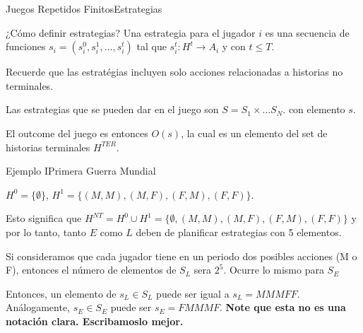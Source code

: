 \documentclass[notes, 11pt]{beamer} %
\newenvironment{wideitemize}{\itemize\addtolength{\itemsep}{10pt}}{\enditemize}
\begin{document}
\begin{frame}{Juegos Repetidos Finitos}{Estrategias}
	\begin{wideitemize}
		\item<1-> ¿C\'omo definir estrategias? Una estrategia para el jugador $i$ es una secuencia de funciones $s_{i} = (s_{i}^{0}, s_{i}^{1}, \dots, s_{i}^{t})$ tal que $s_{i}^{t}: H^{t} \rightarrow A_{i}$ y con $t\leq T$.
		\item<2-> Recuerde que las estrat\'egias incluyen solo acciones relacionadas a historias no terminales.
		\item<3-> Las estrategias que se pueden dar en el juego son $S = S_{1} \times \dots S_{N}$. con elemento $s$.
		\item<4-> El outcome del juego es entonces $O(s)$, la cual es un elemento del set de historias terminales $H^{TER}$.
	\end{wideitemize}
\end{frame}

\begin{frame}{Ejemplo I}{Primera Guerra Mundial}
	\begin{wideitemize}
		\item<1-> $H^{0} = \{ \emptyset \}$, $H^{1} = \{ (M,M), (M,F), (F,M), (F,F) \}$.
		\item<2-> Esto significa que $H^{NT} = H^{0} \cup H^{1} = \{ \emptyset, (M,M), (M,F), (F,M), (F,F) \}$ y por lo tanto, tanto $E$ como $L$ deben de planificar estrategias con 5 elementos.
		\item<3-> Si consideramos que cada jugador tiene en un periodo dos posibles acciones (M o F), entonces el n\'umero de elementos de $S_{L}$ sera $2^{5}$. Ocurre lo mismo para $S_{E}$
		\item<4-> Entonces, un elemento de $s_{L} \in S_{L}$ puede ser igual a $s_{L} = MMMFF$. An\'alogamente, $s_{E} \in S_{E}$ puede ser $s_{E} = FMMMF$. \textbf{Note que esta no es una notaci\'on clara. Escribamoslo mejor.}
	\end{wideitemize}
\end{frame}
\end{document}
